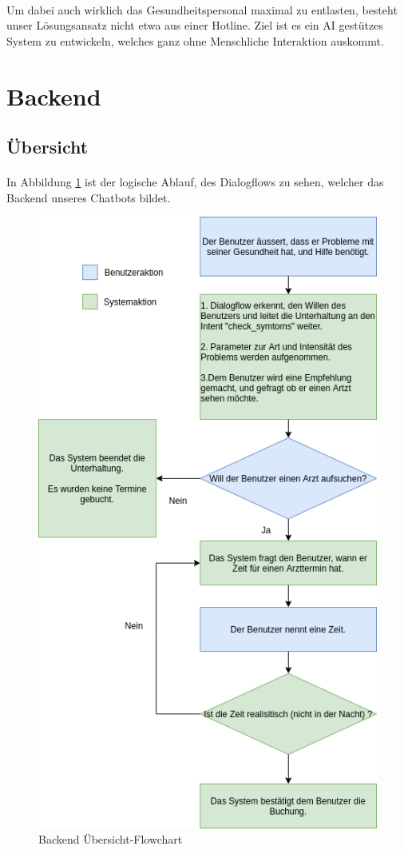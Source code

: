 \documentclass[11pt,a4paper]{article}
\begin{document}
        \paragraph{}
            Um dabei auch wirklich das Gesundheitspersonal maximal zu entlasten, besteht unser
            Lösungsansatz nicht etwa aus einer Hotline. Ziel ist es ein AI gestützes System zu entwickeln,
            welches ganz ohne Menschliche Interaktion auskommt.


\newpage

\section{Backend}
    \subsection{Übersicht}
        \paragraph{}
        In Abbildung \ref{fig:backEndFlowChart} ist der logische Ablauf, des Dialogflows zu sehen, welcher das
        Backend unseres Chatbots bildet.
        \begin{figure}[h!]
            \begin{center}
                \includegraphics[width=0.6\linewidth]{backendOverview.png}
                \caption{Backend Übersicht-Flowchart}
                \label{fig:backEndFlowChart}
            \end{center}
        \end{figure}
        \newpage
\end{document}
